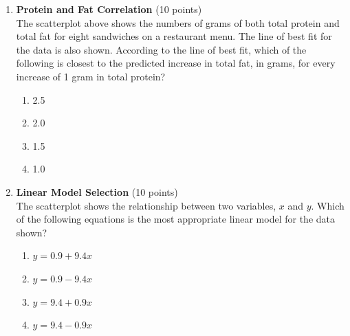 \begin{enumerate}
  \newpage

  \item \textbf{Protein and Fat Correlation} (10 points)\\
  The scatterplot above shows the numbers of grams of both total protein and total fat for eight sandwiches on a restaurant menu. The line of best fit for the data is also shown. According to the line of best fit, which of the following is closest to the predicted increase in total fat, in grams, for every increase of 1 gram in total protein?
  \begin{enumerate}[label=(\Alph*)]
    \item 2.5
    \item 2.0
    \item 1.5
    \item 1.0
  \end{enumerate}
  \begin{subanswer}
  \end{subanswer}


  \newpage

  \item \textbf{Linear Model Selection} (10 points)\\
  The scatterplot shows the relationship between two variables, $x$ and $y$.
  Which of the following equations is the most appropriate linear model for the data shown?
  \begin{enumerate}[label=(\Alph*)]
    \item $y=0.9+9.4 x$
    \item $y=0.9-9.4 x$
    \item $y=9.4+0.9 x$
    \item $y=9.4-0.9 x$
  \end{enumerate}
  \begin{subanswer}
  \end{subanswer}


\end{enumerate}
